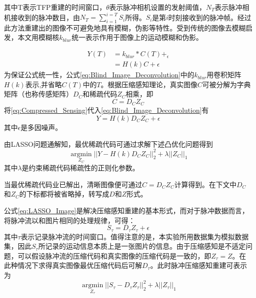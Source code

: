 其中T表示TFP重建的时间窗口，$\theta$表示脉冲相机设置的发射阈值，$N_T$表示脉冲相机接收到的脉冲数目，由$N_T=\sum_{i=1}^{i=T} S_i$所得。$S_i$是第$i$时刻接收到的脉冲帧。经过此方法重建出的图像不可避免地具有模糊，伪影等特性。受到传统的图像去模糊\cite{Blind_Image_Deconvolution}启发，本文用模糊核$k_{blur}$统一表示作用于图像上的运动模糊和伪影。

\begin{equation}
    \begin{aligned}
        Y(T) & = k_{blur} * C(T) +_ \epsilon \\
             & = H(k)C + \epsilon
        \label{eq:Blind_Image_Deconvolution}
    \end{aligned}
\end{equation}
为保证公式统一性，公式\ref{eq:Blind_Image_Deconvolution}中的$k_{blur}$用卷积矩阵$H(k)$表示,并省略$C(T)$中的$T$。根据压缩感知理论，真实图像$C$可被分解为字典矩阵（也称传感矩阵）$D_C$和稀疏代码$Z_C$相乘，即
\begin{equation}
    C = D_CZ_C
    \label{eq:Compressed_Sensing}
\end{equation}
将\ref{eq:Compressed_Sensing}代入\ref{eq:Blind_Image_Deconvolution}有
\begin{equation}
    Y = H(k)D_CZ_C + \epsilon
    \label{eq:Compressed_Sensing_for_Blind_Image_Deconvolution}
\end{equation}
其中$\epsilon$是多因噪声。

由LASSO问题通解知，最优稀疏代码可通过求解下述凸优化问题得到
\begin{equation}
    \mathop{\arg\min}\limits_{Z_C} ||Y-H(k)D_CZ_C||_2^2 + \lambda||Z_C||_1
    \label{eq:LASSO_Image}
\end{equation}
其中$\lambda$是约束稀疏代码稀疏性的正则化参数。

当最优稀疏代码业已解出，清晰图像便可通过$C = D_C Z_C$计算得到。在下文中$D_C$和$Z_C$的下标都将被省略掉，转写成$D$和$Z$形式。

公式\ref{eq:LASSO_Image}是解决压缩感知重建的基本形式，而对于脉冲数据而言，将脉冲流以和图片相同的处理规律，可得：
\begin{equation}
    S_{\tau} = D_{\tau}Z_{\tau} + \epsilon
    \label{eq:Compressed_Sensing_for_Spike}
\end{equation}
其中$\tau$表示记录脉冲流的时间窗口。值得注意的是，本实验所用数据集为模拟数据集，因此$S_{\tau}$所记录的运动信息本质上是一张图片的信息。由于压缩感知是不适定问题，可以假设脉冲流的压缩代码和真实图像的压缩代码是一致的，即$Z_{\tau} = Z$。在此种情况下求得真实图像最优压缩代码后可解$D_{\tau}$。此时脉冲压缩感知重建可表示为
\begin{equation}
    \mathop{\arg\min}\limits_{Z_{\tau}} ||S_{\tau}-D_{\tau}Z_{\tau}||_2^2 + \lambda||Z_{\tau}||_1
    \label{eq:LASSO_Spike}
\end{equation}

